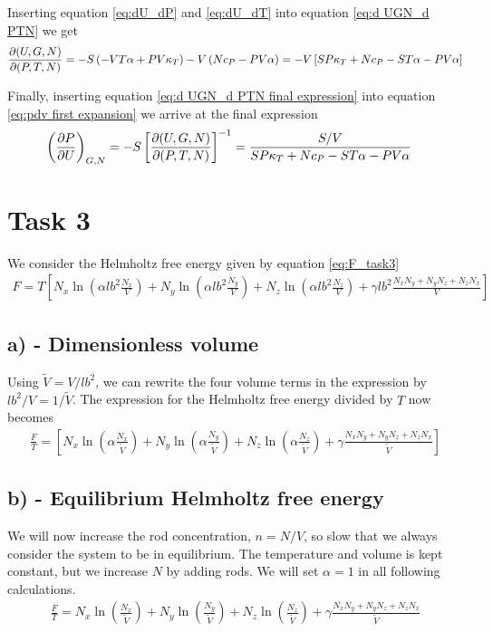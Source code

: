 \documentclass[reprint,english,notitlepage,aps,nobalancelastpage,nofootinbib]{revtex4-1}
\newcommand{\closed}[1]{\left(#1\right)}
\newcommand{\bracket}[1]{\left[#1\right]}
\newcommand{\kt}{\kappa_T}
\renewcommand{\cp}{c_P}
\renewcommand{\a}{\alpha}
\newcommand{\tmdv}[4]{\closed{\pdv{#1}{#2}}_{#3,#4}}
\newcommand{\jacobian}[2]{\pdv{(#1)}{(#2)}}
\newcommand{\nx}{N_x}
\newcommand{\ny}{N_y}
\newcommand{\nz}{N_z}
\begin{document}
Inserting equation \eqref{eq:dU_dP} and \eqref{eq:dU_dT} into equation \eqref{eq:d UGN_d PTN} we get 
\begin{align}
	\jacobian{U,G,N}{P,T,N} = -S \closed{-VT \a + PV\kt} - V \closed{N\cp - PV\a} = -V\bracket{SP\kt + N\cp -ST\a - PV\a} \label{eq:d UGN_d PTN final expression}
\end{align}

Finally, inserting equation \eqref{eq:d UGN_d PTN final expression} into equation \eqref{eq:pdv first expansion} we arrive at the final expression 
\begin{align}
	\tmdv{P}{U}{G}{N} &= -S \bracket{\jacobian{U,G,N}{P,T,N}}^{-1} = \frac{S/V}{SP\kt + N\cp -ST\a - PV\a}
\end{align}


\section*{\large Task 3}
We consider the Helmholtz free energy given by equation \eqref{eq:F_task3}
\begin{align} \label{eq:F_task3}
	F = T \bracket{N_x \ln\closed{\a l b^2 \frac{N_x}{{V}}} + N_y \ln\closed{\a l b^2 \frac{N_y}{{V}}} + N_z \ln\closed{\a l b^2 \frac{N_z}{{V}}} + \gamma l b^2 \frac{\nx\ny+\ny\nz+\nz\nx}{{V}} }
\end{align}

\subsection*{a) - Dimensionless volume}
Using $\tilde{V}=V/lb^2$, we can rewrite the four volume terms in the expression by $lb^2/V=1/\tilde{V}$. The expression for the Helmholtz free energy divided by $T$ now becomes 
\begin{align*} 
	\frac{F}{T} = \bracket{N_x \ln\closed{\a  \frac{N_x}{\tilde{V}}} + N_y \ln\closed{\a  \frac{N_y}{\tilde{V}}} + N_z \ln\closed{\a  \frac{N_z}{\tilde{V}}} + \gamma \frac{\nx\ny+\ny\nz+\nz\nx}{\tilde{V}} }
\end{align*}

\subsection*{b) - Equilibrium Helmholtz free energy}
We will now increase the rod concentration, $n=N/V$, so slow that we always consider the system to be in equilibrium. The temperature and volume is kept constant, but we increase $N$ by adding rods. We will set $\alpha=1$ in all following calculations.  
\begin{align} \label{eq:F_dimless}
	\frac{F}{T} = N_x \ln\closed{\frac{N_x}{\tilde{V}}} + N_y \ln\closed{\frac{N_y}{\tilde{V}}} + N_z \ln\closed{\frac{N_z}{\tilde{V}}} + \gamma \frac{\nx\ny+\ny\nz+\nz\nx}{\tilde{V}}
\end{align}
\end{document}
